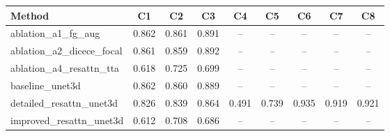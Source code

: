 \begin{tabular}{lcccccccc}
\toprule
Method & C1 & C2 & C3 & C4 & C5 & C6 & C7 & C8 \\
\midrule
ablation\_a1\_fg\_aug & 0.862 & 0.861 & 0.891 & -- & -- & -- & -- & -- \\
ablation\_a2\_dicece\_focal & 0.861 & 0.859 & 0.892 & -- & -- & -- & -- & -- \\
ablation\_a4\_resattn\_tta & 0.618 & 0.725 & 0.699 & -- & -- & -- & -- & -- \\
baseline\_unet3d & 0.862 & 0.860 & 0.889 & -- & -- & -- & -- & -- \\
detailed\_resattn\_unet3d & 0.826 & 0.839 & 0.864 & 0.491 & 0.739 & 0.935 & 0.919 & 0.921 \\
improved\_resattn\_unet3d & 0.612 & 0.708 & 0.686 & -- & -- & -- & -- & -- \\
\bottomrule
\end{tabular}
